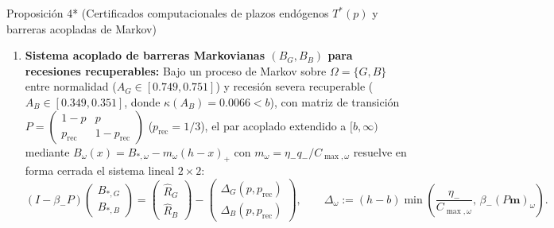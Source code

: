 \documentclass[11pt,letterpaper]{article}
\theoremstyle{plain}
\newtheorem*{namedthm}{\protect\namedthmname}
\newcommand{\namedthmname}{}
\newenvironment{thm_box}[1]{\renewcommand{\namedthmname}{#1}\begin{namedthm}}{\end{namedthm}}
\begin{document}
\begin{thm_box}{Proposición 4* (Certificados computacionales de plazos endógenos $T^*(p)$ y barreras acopladas de Markov)}
\begin{enumerate}
\begin{itemize}
\item El plazo máximo certificado de entrada antes de una crisis \textbf{$T^*(p)$ crece endógenamente con $p$} ($T^*(0)=22$, $T^*(0.5\%)=25$, $T^*(1.0\%)=30$, $T^*(1.5\%)=40$, $T^*(2.0\%)=84$), demostrando que la cota inferior certificada válida bajo anticipación racional $\mathbb{P}_p(\text{Supervivencia hasta } H)\ge (1-p)^{T^*(p)}$ cae hasta \textbf{$0.1832$} en $p=2.0\%$ frente a la cota determinista miope $(1-0.02)^{23}=0.6283$ (ambas son cotas de peor caso, por debajo de la supervivencia efectiva a lo largo del testigo de entrada en $4$ períodos).
\end{itemize}
\item \textbf{Sistema acoplado de barreras Markovianas $(B_G,B_B)$ para recesiones recuperables:} Bajo un proceso de Markov sobre $\Omega=\{G,B\}$ entre normalidad ($A_G\in[0.749,0.751]$) y recesión severa recuperable ($A_B\in[0.349,0.351]$, donde $\kappa(A_B)=0.0066<b$), con matriz de transición $P=\begin{pmatrix}1-p & p\\ p_{\mathrm{rec}} & 1-p_{\mathrm{rec}}\end{pmatrix}$ ($p_{\mathrm{rec}}=1/3$), el par acoplado extendido a $[b,\infty)$ mediante $B_\omega(x)=B_{*,\omega}-m_\omega(h-x)_+$ con $m_\omega=\eta_- q_-/C_{\max,\omega}$ resuelve en forma cerrada el sistema lineal $2\times 2$:
\[
(I-\beta_- P)\begin{pmatrix}B_{*,G}\\ B_{*,B}\end{pmatrix} = \begin{pmatrix}\widehat{R}_G\\ \widehat{R}_B\end{pmatrix} - \begin{pmatrix}\Delta_G(p,p_{\mathrm{rec}})\\ \Delta_B(p,p_{\mathrm{rec}})\end{pmatrix}, \qquad \Delta_\omega := (h-b)\min\!\left(\frac{\eta_-}{C_{\max,\omega}},\,\beta_-(P\mathbf{m})_\omega\right).
\]

\end{enumerate}
\end{thm_box}
\end{document}
